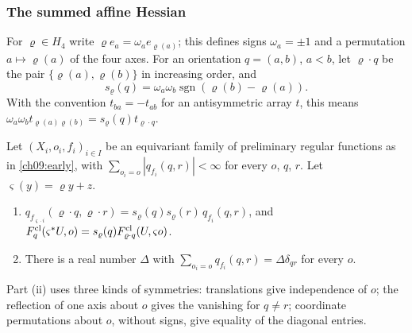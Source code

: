 \subsubsection*{The summed affine Hessian}

For $\varrho\in H_4$ write $\varrho e_a=\omega_ae_{\varrho(a)}$; this
defines signs $\omega_a=\pm1$ and a permutation $a\mapsto\varrho(a)$ of
the four axes. For an orientation $q=(a,b)$, $a<b$, let $\varrho\cdot q$
be the pair $\{\varrho(a),\varrho(b)\}$ in increasing order, and
\[
 s_\varrho(q)=\omega_a\omega_b
        \operatorname{sgn}(\varrho(b)-\varrho(a)).
\]
With the convention $t_{ba}=-t_{ab}$ for an antisymmetric array $t$,
this means
$\omega_a\omega_bt_{\varrho(a)\varrho(b)}=s_\varrho(q)t_{\varrho\cdot q}$.

\begin{lemma}
\label{ch09:isotropy}
Let $(X_i,o_i,f_i)_{i\in I}$ be an equivariant family of preliminary
regular functions as in \eqref{ch09:early}, with
$\sum_{o_i=o}|q_{f_i}(q,r)|<\infty$ for every $o$, $q$, $r$. Let
$\varsigma(y)=\varrho y+z$.
\begin{enumerate}[label=\textup{(\roman*)}]
\item $q_{f_{\varsigma\cdot i}}(\varrho\cdot q,\varrho\cdot r)
 =s_\varrho(q)s_\varrho(r)\,q_{f_i}(q,r)$, and
 $F^{\rm cl}_q(\varsigma^*U,o)
 =s_\varrho(q)F^{\rm cl}_{\varrho\cdot q}(U,\varsigma o)$.
\item There is a real number $\Delta$ with
 $\sum_{o_i=o}q_{f_i}(q,r)=\Delta\delta_{qr}$ for every $o$.
\end{enumerate}
Part \textup{(ii)} uses three kinds of symmetries: translations give
independence of $o$; the reflection of one axis about $o$ gives the
vanishing for $q\ne r$; coordinate permutations about $o$, without
signs, give equality of the diagonal entries.
\end{lemma}

